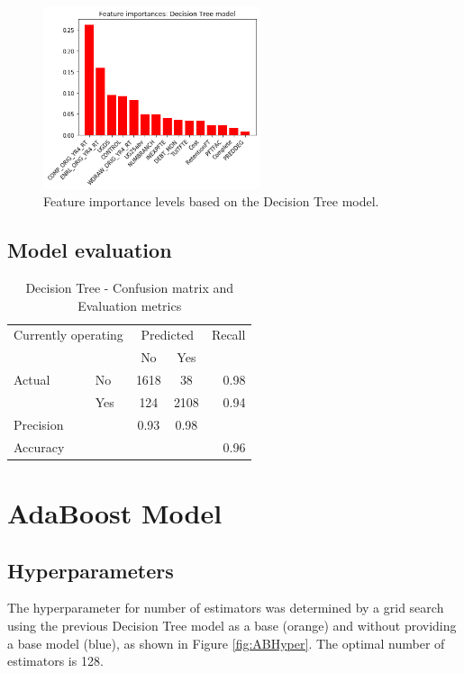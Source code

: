 \documentclass[11pt, letterpaper]{article}
\begin{document}
\begin{figure}[h]
\begin{center}
\includegraphics[width=2.5in]{DTFeatureImportance.png}
\caption{Feature importance levels based on the Decision Tree model.} 
\label{fig:DTFeatures}
\end{center}
\end{figure}

\subsection{Model evaluation}

\begin{table}[h]
\begin{center}
\caption{Decision Tree - Confusion matrix and Evaluation metrics}
\begin{tabular}{l l | c c r }
\multicolumn{2}{l}{Currently operating} & \multicolumn{2}{c}{Predicted} & Recall \\
& & No & Yes &  \\ 
\cline{2-5}
Actual & No & 1618 &  38 & 0.98 \\
& Yes & 124 & 2108 & 0.94 \\  \hline
Precision&  & 0.93 & 0.98 \\ 
Accuracy & & &  & 0.96 \\
\end{tabular}
\label{tab:DTConfusion}
\end{center}
\end{table} 

\section{AdaBoost Model}

\subsection{Hyperparameters}
The hyperparameter for number of estimators was determined by a grid search using the previous Decision Tree model as a base (orange) and without providing a base model (blue), as shown in Figure \ref{fig:ABHyper}. The optimal number of estimators is 128.
\end{document}
